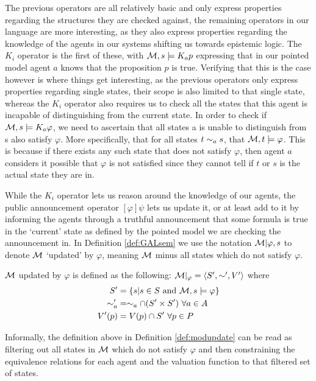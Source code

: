 The previous operators are all relatively basic and only express properties regarding the structures they are checked against, the remaining operators in our language are more interesting, as they also express properties regarding the knowledge of the agents in our systems shifting us towards epistemic logic. The $K_i$ operator is the first of these, with $\mathcal{M} ,s \models K_ap$ expressing that in our pointed model agent $a$ knows that the proposition $p$ is true. Verifying that this is the case however is where things get interesting, as the previous operators only express properties regarding single states, their scope is also limited to that single state, whereas the $K_i$ operator also requires us to check all the states that this agent is incapable of distinguishing from the current state. In order to check if $\mathcal{M},s \models K_a\varphi$, we need to ascertain that all states a is unable to distinguish from s also satisfy $\varphi$. More specifically, that for all states $t\sim_as$, that $\mathcal{M},t \models\varphi$. This is because if there exists any such state that does not satisfy $\varphi$, then agent $a$ considers it possible that $\varphi$ is not satisfied since they cannot tell if $t$ or $s$ is the actual state they are in.

While the $K_i$ operator lets us reason around the knowledge of our agents, the public announcement operator $[\varphi]\psi$ lets us update it, or at least add to it by informing the agents through a truthful announcement that some formula is true in the `current' state as defined by the pointed model we are checking the announcement in.
In Definition \ref{def:GALsem} we use the notation $\mathcal{M}|\varphi,s$ to denote $\mathcal{M}$ `updated' by $\varphi$, meaning $\mathcal{M}$ minus all states which do not satisfy $\varphi$.

\begin{definition}
	\label{def:modupdate}
	$\mathcal{M}$ updated by $\varphi$ is defined as the following: $\mathcal{M}|_\varphi = \langle S',\sim',V'\rangle$ where 
	\begin{align*}
			S' &= \{s| s\in S\textrm{ and }\mathcal{M},s \models\varphi\} \\
			\sim_a' &= \sim_a \cap (S' \times S')~ \forall a\in A\\
			V'(p) &= V(p) \cap S'~ \forall p \in P
	\end{align*}
\end{definition}

Informally, the definition above in Definition \ref{def:modupdate} can be read as filtering out all states in $\mathcal{M}$ which do not satisfy $\varphi$ and then constraining the equivalence relations for each agent and the valuation function to that filtered set of states.

